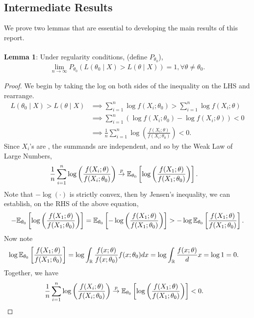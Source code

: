 \subsection{Intermediate Results}
We prove two lemmas that are essential to developing the main results of this report.\\\\
\textbf{Lemma 1}: Under regularity conditions, \bred (define $P_{\theta_0}$), \ered
\begin{align}
\lim_{n\to\infty} P_{\theta_0}\left( L(\theta_0 \mid X) > L(\theta \mid X) \right) = 1, \forall \theta \neq \theta_0.
\end{align}
\begin{proof}
We begin by taking the log on both sides of the inequality on the LHS and rearrange. 
\begin{align}
L(\theta_0 \mid X) > L(\theta \mid X) &\implies \sum_{i=1}^n \log f(X_i;\theta_0) > \sum_{i=1}^n \log f(X_i;\theta)\\
&\implies \sum_{i=1}^n \left(\log f(X_i;\theta_0) - \log f(X_i;\theta)\right) < 0\\
&\implies \frac{1}{n}\sum_{i=1}^n\log\left( \frac{f(X_i;\theta)}{f(X_i;\theta_0)} \right) < 0. \label{eqn:rearrange}
\end{align}
Since $X_i$'s are \iid, the summands are independent, and so by the Weak Law of Large Numbers,
\begin{align}
\frac{1}{n}\sum_{i=1}^n\log\left( \frac{f(X_i;\theta)}{f(X_i;\theta_0)} \right) &\overset{p}{\rightarrow} \mathbb{E}_{\theta_0}\left[ \log \left( \frac{f(X_1; \theta)}{f(X_1; \theta_0)} \right) \right].
\end{align}
Note that $-\log(\cdot)$ is strictly convex, then by Jensen's inequality, we can establish, on the RHS of the above equation,
\begin{align}
-\mathbb{E}_{\theta_0}\left[ \log \left( \frac{f(X_1; \theta)}{f(X_1; \theta_0)} \right) \right] = \mathbb{E}_{\theta_0}\left[ -\log \left( \frac{f(X_1; \theta)}{f(X_1; \theta_0)} \right) \right] > -\log \mathbb{E}_{\theta_0}\left[ \frac{f(X_1; \theta)}{f(X_1; \theta_0)}  \right].
\end{align}
Now note
\begin{align}
\log \mathbb{E}_{\theta_0} \left[ \frac{f(X_1; \theta)}{f(X_1; \theta_0)} \right] &= \log \int_{\mathbb{R}} \frac{f(x; \theta)}{f(x; \theta_0)} f(x; \theta_0) dx = \log\int_{\mathbb{R}} \frac{f(x; \theta)} dx = \log 1 = 0.
\end{align}
Together, we have
\begin{align}
\frac{1}{n}\sum_{i=1}^n\log\left( \frac{f(X_i;\theta)}{f(X_i;\theta_0)} \right) &\convP \bbE_{\theta_0}\left[ \log \left( \frac{f(X_1; \theta)}{f(X_1; \theta_0)} \right) \right] < 0. \label{eqn:convp}

\end{align}
\end{proof}
